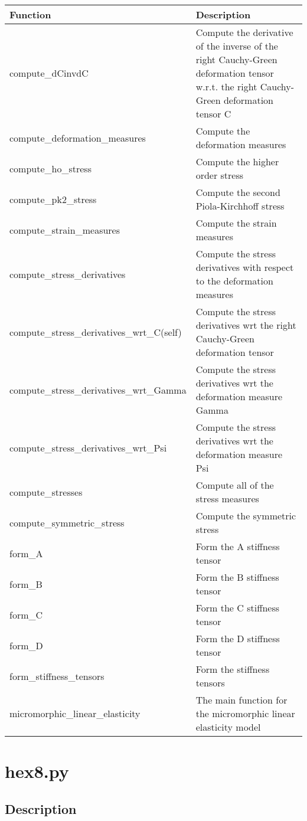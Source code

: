 \documentclass{asme2ej}
\begin{document}
\begin{longtable}{p{} p{}}
\hline
Function & Description\\
\hline
\hline
compute\_dCinvdC & Compute the derivative of the inverse of the right Cauchy-Green deformation tensor w.r.t. the right Cauchy-Green deformation tensor C\\
compute\_deformation\_measures & Compute the deformation measures \\
compute\_ho\_stress & Compute the higher order stress\\
compute\_pk2\_stress & Compute the second Piola-Kirchhoff stress\\
compute\_strain\_measures & Compute the strain measures\\
compute\_stress\_derivatives & Compute the stress derivatives with respect to the deformation measures\\
compute\_stress\_derivatives\_wrt\_C(self) & Compute the stress derivatives wrt the right Cauchy-Green deformation tensor\\
compute\_stress\_derivatives\_wrt\_Gamma & Compute the stress derivatives wrt the deformation measure Gamma\\
compute\_stress\_derivatives\_wrt\_Psi & Compute the stress derivatives wrt the deformation measure Psi\\
compute\_stresses & Compute all of the stress measures\\
compute\_symmetric\_stress &  Compute the symmetric stress\\
form\_A & Form the A stiffness tensor\\
form\_B & Form the B stiffness tensor\\
form\_C & Form the C stiffness tensor\\
form\_D & Form the D stiffness tensor\\
form\_stiffness\_tensors & Form the stiffness tensors\\
micromorphic\_linear\_elasticity & The main function for the micromorphic linear elasticity model\\
\hline
\end{longtable}

\clearpage
\section{hex8.py}

\subsection{Description}
\end{document}
